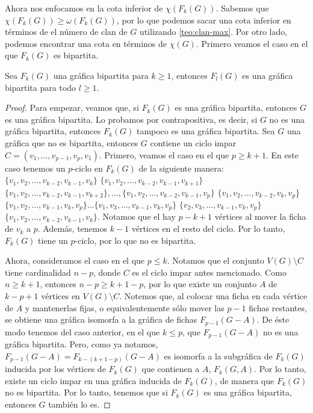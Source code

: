 
Ahora nos enfocamos en la cota inferior de $ \chi (F_k(G))$. Sabemos que $\chi
(F_k(G)) \geq \omega (F_k(G))$, por lo que podemos sacar una cota inferior en
t\'erminos de el n\'umero de clan de $G$ utilizando \cref{teo:clan-max}. Por
otro lado, podemos encontrar una cota en t\'erminos de $\chi (G)$. Primero
veamos el caso en el que $F_k(G)$ es bipartita.


\begin{proposicion}
\label{prop:biparticion F(G)}
    Sea $F_k(G)$ una gr\'afica bipartita para $k \geq 1$, entonces $F_l(G)$
    es una gr\'afica bipartita para todo $l \geq 1$.
\end{proposicion}

\begin{proof}
    Para empezar, veamos que, si $F_k(G)$ es una gr\'afica bipartita, entonces
    $G$ es una gr\'afica bipartita. Lo probamos por contrapositiva, es decir,
    si $G$ no es una gr\'afica bipartita, entonces $F_k(G)$ tampoco es una
    gr\'afica bipartita. Sea $G$ una gr\'afica que no es bipartita, entonces $G$
    contiene un ciclo impar $C=(v_1, \dots, v_{p-1}, v_p, v_1)$. Primero, veamos
    el caso en el que $p \geq k+1$. En este caso tenemos un $p$-ciclo en
    $F_k(G)$ de la siguiente manera: $\{v_1, v_2, \dots, v_{k-2}, v_{k-1},
    v_k\}$ $\{v_1, v_2, \dots, v_{k-2}, v_{k-1}, v_{k+1}\}$ $\{v_1, v_2, \dots,
    v_{k-2}, v_{k-1}, v_{k+2}\}, \dots, \{v_1, v_2, \dots, v_{k-2}, v_{k-1},
    v_p\}$ $\{v_1, v_2, \dots, v_{k-2}, v_k, v_p\}$ $\{v_1, v_2, \dots, v_{k-1},
    v_k, v_p\} \dots \{v_1, v_3, \dots, v_{k-1}, v_k, v_p\}$ $\{v_2, v_3,
    \dots, v_{k-1}, v_k, v_p\}$ $\{v_1, v_2, \dots, v_{k-2}, v_{k-1}, v_k\}$.
    Notamos que el hay $p-k+1$ v\'ertices al mover la ficha de $v_k$ a $p$.
    Adem\'as, tenemos $k-1$ v\'ertices en el resto del ciclo. Por lo tanto,
    $F_k(G)$ tiene un $p$-ciclo, por lo que no es bipartita.
    
    Ahora, consideramos el caso en el que $p \leq k$. Notamos que el conjunto
    $V(G)\setminus C$ tiene cardinalidad $n-p$, donde $C$ es el ciclo impar
    antes mencionado. Como $n \geq k+1$, entonces $n-p \geq k+1-p$, por lo que
    existe un conjunto $A$ de $k-p+1$ v\'ertices en $V(G)\setminus C$. Notemos
    que, al colocar una ficha en cada v\'ertice de $A$ y mantenerlas fijas, o
    equivalentemente s\'olo mover las $p-1$ fichas restantes, se obtiene una
    gr\'afica isomorfa a la gr\'afica de fichas $F_{p-1}(G-A)$. De \'este modo
    tenemos del caso anterior, en el que $k \leq p$, que $F_{p-1}(G-A)$ no es
    una gr\'afica bipartita. Pero, como ya notamos, $F_{p-1}(G-A) = F_{k-(k+1-p)}
    (G-A)$ es isomorfa a la subgr\'afica de $F_k(G)$ inducida por los v\'ertices
    de $F_k(G)$ que contienen a $A$, $F_k(G,A)$. Por lo tanto, existe un ciclo
    impar en una gr\'afica inducida de $F_k(G)$, de manera que $F_k(G)$ no es
    bipartita. Por lo tanto, tenemos que si $F_k(G)$ es una gr\'afica bipartita,
    entonces $G$ tambi\'en lo es.


\end{proof}

